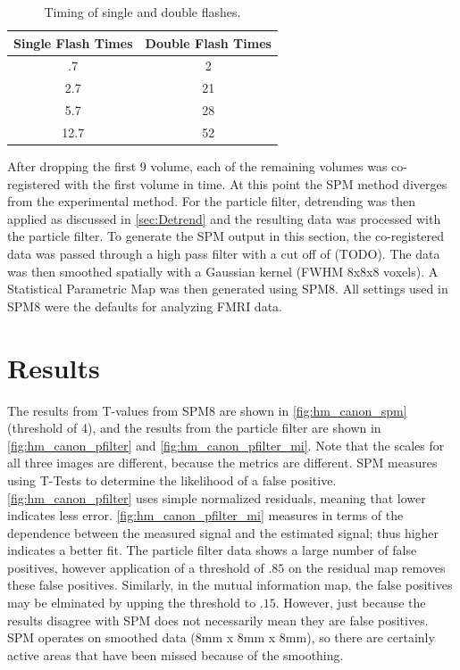 \begin{table}[t]
\centering
\begin{tabular}{|c || c |}
\hline 
Single Flash Times & Double Flash Times \\
\hline 
.7 & 2\\
2.7 & 21\\
5.7 & 28\\
12.7 & 52\\
\hline 
\end{tabular}
\caption{Timing of single and double flashes.}
\label{tab:flashes} 
\end{table}

After dropping the first 9 volume, each of the remaining volumes was
co-registered with the first volume in time. At this point the SPM method
diverges from the experimental method. For the particle filter, detrending 
was then applied as discussed in \autoref{sec:Detrend} and the resulting
data was processed with the particle filter. To generate the SPM output
in this section, the co-registered data was passed through a high pass
filter with a cut off of (TODO). The data was then smoothed spatially 
with a Gaussian kernel (FWHM 8x8x8 voxels). A Statistical Parametric Map
was then generated using SPM8. All settings used in SPM8 were the defaults
for analyzing FMRI data.

\section{Results}
The results from T-values from SPM8 are shown in \autoref{fig:hm_canon_spm} (threshold of
4), and the results from 
the particle filter are shown in \autoref{fig:hm_canon_pfilter} and \autoref{fig:hm_canon_pfilter_mi}.
Note that the scales for all three images are different, because the metrics are different.
SPM measures using T-Tests to determine the likelihood of a false positive. \autoref{fig:hm_canon_pfilter}
uses simple normalized residuals, meaning that lower indicates less error.  
\autoref{fig:hm_canon_pfilter_mi} measures in terms of the dependence between the 
measured signal and the estimated signal; thus higher indicates a better fit. The particle
filter data shows a large number of false positives, however application of a threshold
of $.85$ on the residual map removes these false positives. Similarly, in the mutual information
map, the false positives may be elminated by upping the threshold to $.15$. However, just
because the results disagree with SPM does not necessarily mean they are false positives.
SPM operates on smoothed data (8mm x 8mm x 8mm), so there are certainly active 
areas that have been missed because of the smoothing. 

